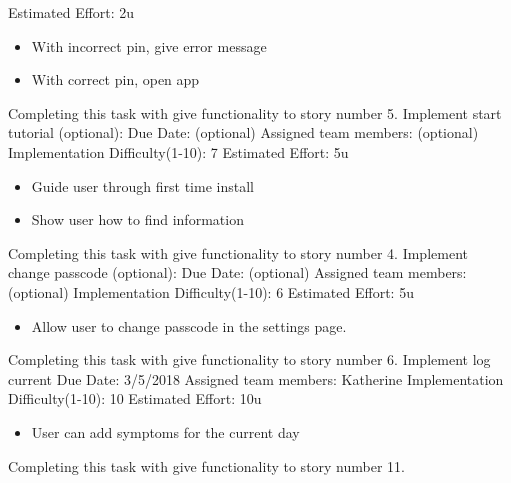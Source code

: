 \documentclass[letterpaper,12pt,titlepage]{article}
\begin{document}
\newline
Estimated Effort: 2u
\begin{itemize}
\item With incorrect pin, give error message
\item With correct pin, open app
\end{itemize}
Completing this task with give functionality to story number 5.
\newline
\newline
Implement start tutorial (optional):
\newline
Due Date: (optional)
\newline
Assigned team members: (optional)
\newline
Implementation Difficulty(1-10): 7
\newline
Estimated Effort: 5u
\begin{itemize}
\item Guide user through first time install
\item Show user how to find information
\end{itemize}
Completing this task with give functionality to story number 4.
\newline
\newline
Implement change passcode (optional): 
\newline
Due Date: (optional)
\newline
Assigned team members: (optional)
\newline
Implementation Difficulty(1-10): 6
\newline
Estimated Effort: 5u
\begin{itemize}
\item Allow user to change passcode in the settings page.
\end{itemize}
Completing this task with give functionality to story number 6.
\newline
\newline
Implement log current
\newline
Due Date: 3/5/2018
\newline
Assigned team members: Katherine
\newline
Implementation Difficulty(1-10): 10
\newline
Estimated Effort: 10u
\begin{itemize}
\item User can add symptoms for the current day
\end{itemize}
Completing this task with give functionality to story number 11.
\newline
\end{document}
